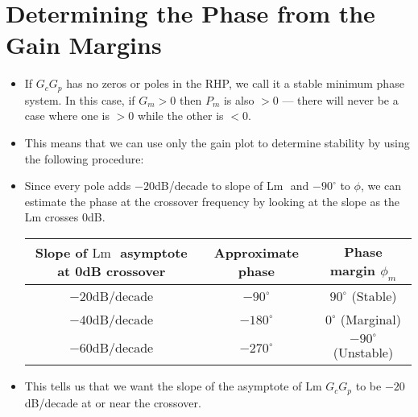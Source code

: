 \documentclass{book}
\newcommand{\Lm}{\textrm{Lm }}
\begin{document}
\section*{Determining the Phase from the Gain Margins}
\begin{itemize}
	\item If $ G_cG_p $ has no zeros or poles in the RHP, we call it a stable minimum phase system. In this case, if $ G_m>0 $ then $ P_m $ is also $ >0 $ --- there will never be a case where one is $ >0 $ while the other is $ <0 $.
	\item This means that  we can use only the gain plot to determine stability by using the following procedure:
	\item Since every pole adds $ -20 $dB/decade to slope of $ \Lm $ and $ -90^\circ $ to $ \phi $, we can estimate the phase at the crossover frequency by looking at the slope as the Lm crosses 0dB.
	\begin{center}
		\begin{tabular}{c|c|c}
			\begin{minipage}{0.16\textwidth}
				\centering
				Slope of $ \Lm $ asymptote at 0dB crossover
				\vspace{2pt}
			\end{minipage} & 
			\begin{minipage}{0.16\textwidth}
				\centering
				Approximate phase
				\vspace{2pt}
			\end{minipage} &
			\begin{minipage}{0.16\textwidth}
				\centering
				Phase margin $ \phi_m $
				\vspace{2pt}
			\end{minipage}\\ \hline\vspace{2pt}
			$ -20 $dB/decade & $ -90^\circ $ & $ 90^\circ $ (Stable) \\\vspace{2pt}
			$ -40 $dB/decade & $ -180^\circ $ & $ 0^\circ $ (Marginal)\\\vspace{2pt}
			$ -60 $dB/decade & $ -270^\circ $ & $ -90^\circ $ (Unstable)
		\end{tabular}
	\end{center}
	\item This tells us that we want the slope of the asymptote of $ \Lm G_c G_p $ to be $ -20 $dB/decade at or near the crossover.
	\begin{center}
\end{center}
\end{itemize}
\end{document}
